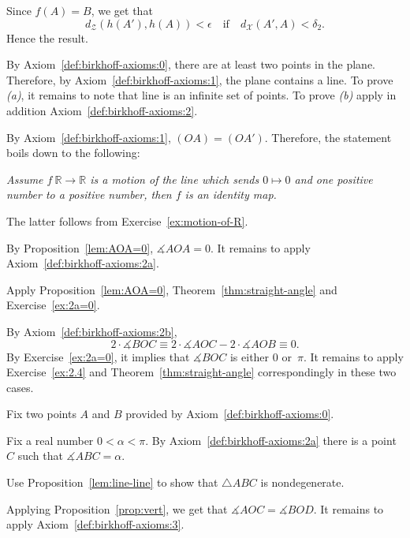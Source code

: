 Since $f(A)=B$, we get that
$$d_{\mathcal{Z}}(h(A'),h(A))<\epsilon
\quad
\text{if}
\quad
d_{\mathcal{X}}(A',A)<\delta_2.$$ 
Hence the result.

\setcounter{eqtn}{0}

 By Axiom~\ref{def:birkhoff-axioms:0}, there are at least two points in the plane.
Therefore, by Axiom~\ref{def:birkhoff-axioms:1}, 
the plane contains a line. 
To prove \textit{(a)}, it remains to note that line is an infinite set of points.
To prove \textit{(b)} apply in addition Axiom~\ref{def:birkhoff-axioms:2}.

\parbf{Exercise~\ref{ex:[OA)=[OA')}.}
By Axiom~\ref{def:birkhoff-axioms:1},
$(OA)=(OA')$.
Therefore, the statement boils down to the following:

\textit{Assume $f\:\mathbb{R}\to \mathbb{R}$ is a motion of the line which sends $0\mapsto 0$ and one positive number to a positive number, then $f$ is an identity map.}

The latter follows from Exercise~\ref{ex:motion-of-R}.

By Proposition~\ref{lem:AOA=0},
$\measuredangle AOA=0$.
It remains to apply Axiom~\ref{def:birkhoff-axioms:2a}.

Apply Proposition~\ref{lem:AOA=0},
Theorem~\ref{thm:straight-angle} 
and Exercise~\ref{ex:2a=0}.

By Axiom~\ref{def:birkhoff-axioms:2b},
$$2\cdot\measuredangle BOC
\equiv 
2\cdot\measuredangle AOC-2\cdot \measuredangle AOB
\equiv 0.$$
By Exercise~\ref{ex:2a=0}, 
it implies that 
$\measuredangle BOC$ is either $0$ or~$\pi$.
It remains to apply Exercise~\ref{ex:2.4} and Theorem~\ref{thm:straight-angle} correspondingly in these two cases.

Fix two points $A$ and $B$ provided by Axiom~\ref{def:birkhoff-axioms:0}.

Fix a real number $0<\alpha<\pi$.
By Axiom~\ref{def:birkhoff-axioms:2a} there is a point $C$ such that $\measuredangle ABC=\alpha$.

Use Proposition~\ref{lem:line-line} to show that $\triangle ABC$ is nondegenerate.

Applying Proposition~\ref{prop:vert}, we get that
$\measuredangle AOC= \measuredangle BOD$.
It remains to apply Axiom~\ref{def:birkhoff-axioms:3}.

